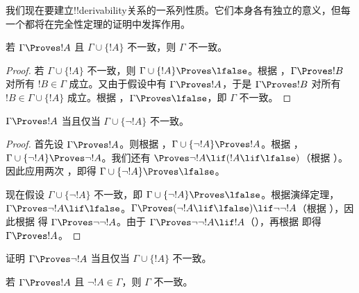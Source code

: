 \documentclass[../../../include/open-logic-section]{subfiles}
\begin{document}
      {}
      {}


我们现在要建立!!{derivability}关系的一系列性质。它们本身各有独立的意义，但每一个都将在完全性定理的证明中发挥作用。

\begin{prop}
  若 $\Gamma \Proves !A$ 且 $\Gamma \cup \{!A\}$ 不一致，则 $\Gamma$ 不一致。
\end{prop}

\begin{proof}
  若 $\Gamma \cup \{!A\}$ 不一致，则 $\Gamma \cup \{!A\} \Proves \lfalse$。根据 ，$\Gamma \Proves !B$ 对所有 $!B \in \Gamma$ 成立。又由于假设中有 $\Gamma \Proves !A$，于是 $\Gamma \Proves !B$ 对所有 $!B \in \Gamma \cup \{!A\}$ 成立。根据 ，$\Gamma \Proves \lfalse$，即 $\Gamma$ 不一致。
\end{proof}

\begin{prop}
$\Gamma \Proves !A$ 当且仅当 $\Gamma \cup \{\lnot !A\}$ 不一致。
\end{prop}

\begin{proof}
首先设 $\Gamma \Proves !A$。则根据 ，$\Gamma \cup \{\lnot !A\} \Proves !A$。根据 ，$\Gamma \cup \{\lnot !A\} \Proves \lnot !A$。我们还有 $\Proves \lnot !A \lif (!A \lif \lfalse)$（根据 ）。因此应用两次 ，即得 $\Gamma \cup \{\lnot !A\} \Proves \lfalse$。

现在假设 $\Gamma \cup \{\lnot !A\}$ 不一致，即 $\Gamma \cup \{\lnot !A\} \Proves \lfalse$。根据演绎定理，$\Gamma \Proves \lnot !A \lif \lfalse$。$\Gamma \Proves (\lnot !A \lif \lfalse) \lif \lnot\lnot !A$（根据 ），因此根据  得 $\Gamma \Proves \lnot\lnot !A$。由于 $\Gamma \Proves \lnot\lnot !A \lif !A$（），再根据  即得 $\Gamma \Proves !A$。
\end{proof}

\begin{prob}
证明 $\Gamma \Proves \lnot !A$ 当且仅当 $\Gamma \cup \{!A\}$ 不一致。
\end{prob}

\begin{prop}
  若 $\Gamma \Proves !A$ 且 $\lnot !A \in \Gamma$，则 $\Gamma$ 不一致。
\end{prop}
\end{document}
